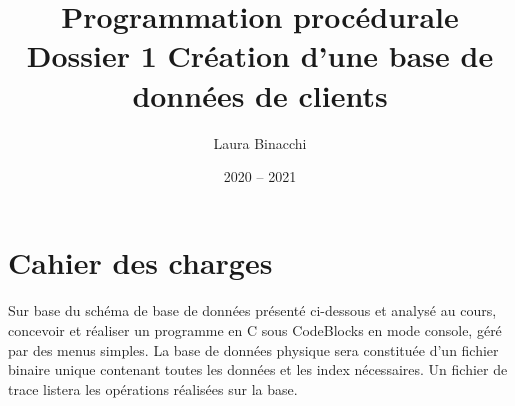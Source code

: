 \documentclass{article}
\title{}
\title{Programmation procédurale\bigbreak \bigbreak
    \large Dossier 1\bigbreak
    \normalsize Création d’une base de données de clients\bigbreak}
\date{2020 -- 2021}
\author{Laura Binacchi}
\begin{document}
    
    \newpage
    \tableofcontents
    \newpage

    \section{Cahier des charges}
    \paragraph{}
    Sur base du schéma de base de données présenté ci-dessous et analysé au cours, concevoir et réaliser un programme en C sous CodeBlocks en mode console, géré par des menus simples. La base de données physique sera constituée d'un fichier binaire unique contenant toutes les données et les index nécessaires. Un fichier de trace listera les opérations réalisées sur la base.
\end{document}
